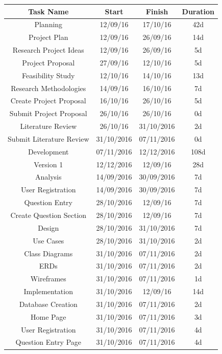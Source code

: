 \begin{table}[h!]
\centering
\begin{tabular}{||c c c c||} 
 \hline
 Task Name & Start & Finish & Duration \\ [0.5ex] 
 \hline\hline
Planning 				& 12/09/16 & 17/10/16 & 42d \\ 
Project Plan 			& 12/09/16 & 26/09/16 & 14d \\
Research Project Ideas	& 12/09/16 & 26/09/16 & 5d \\
Project Proposal 		& 27/09/16 & 12/10/16 & 5d \\
Feasibility Study		& 12/10/16 & 14/10/16 & 13d \\
Research Methodologies 	& 14/09/16 & 16/10/16 & 7d \\
Create Project Proposal   	& 16/10/16 & 26/10/16 & 5d \\
Submit Project Proposal   	& 26/10/16 & 26/10/16 & 0d \\
Literature Review              	& 26/10/16 & 31/10/2016 & 2d \\
Submit Literature Review  & 31/10/2016 & 07/11/2016 & 0d \\
Development                     & 07/11/2016 & 12/12/2016 & 108d \\
Version 1                           	& 12/12/2016 & 12/09/16 & 28d \\
Analysis                            	& 14/09/2016 & 30/09/2016 & 7d \\
User Registration 		& 14/09/2016 & 30/09/2016 & 7d \\
Question Entry 			& 28/10/2016 & 12/09/16 & 7d \\
Create Question Section   & 28/10/2016 & 12/09/16 & 7d \\
Design 				& 28/10/2016 & 31/10/2016 & 7d \\
Use Cases 			& 28/10/2016 & 31/10/2016 & 2d \\
Class Diagrams 		& 31/10/2016 & 07/11/2016 & 2d \\
ERDs 				& 31/10/2016 & 07/11/2016 & 2d \\
Wireframes 			& 31/10/2016 & 07/11/2016 & 1d \\
Implementation 		& 31/10/2016 & 12/09/16 & 14d \\
Database Creation 		& 31/10/2016 & 07/11/2016 & 2d \\
Home Page 			& 31/10/2016 & 07/11/2016 & 3d \\
User Registration 		& 31/10/2016 & 07/11/2016 & 4d \\
Question Entry Page 	& 31/10/2016 & 07/11/2016 & 4d \\

\end{tabular}
\end{table}
